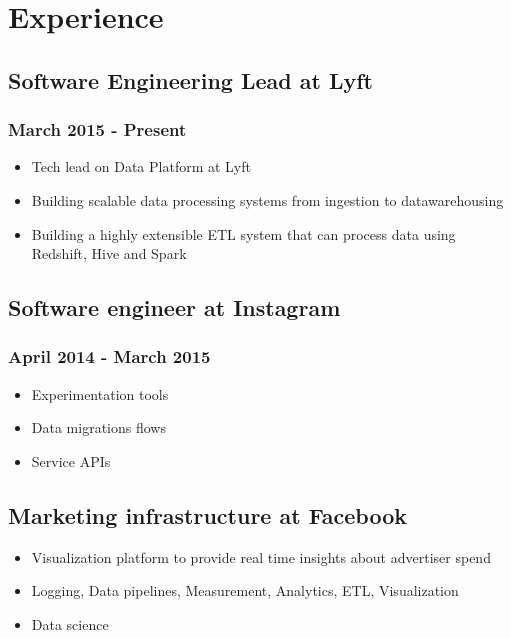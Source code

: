 \documentclass[letterpaper]{article}
\date{\today}
\title{}
\begin{document}

\section{Experience}
\label{sec:Experience}
\subsection{Software Engineering Lead at Lyft}
\label{sec:Software-Engineering-Lead-at-Lyft}
\subsubsection{March 2015 - Present}
\label{sec:March-2015-Present}
\begin{itemize}
\item Tech lead on Data Platform at Lyft
\item Building scalable data processing systems from ingestion to datawarehousing
\item Building a highly extensible ETL system that can process data using Redshift, Hive and Spark
\end{itemize}
\subsection{Software engineer at Instagram}
\label{sec:Software-engineer-at-Instagram}
\subsubsection{April 2014 - March 2015}
\label{sec:April-2014-March-2015}
\begin{itemize}
\item Experimentation tools
\item Data migrations flows
\item Service APIs
\end{itemize}
\subsection{Marketing infrastructure at Facebook}
\label{sec:Marketing-infrastructure-at-Facebook}
\begin{itemize}
\item Visualization platform to provide real time insights about advertiser spend
\item Logging, Data pipelines, Measurement, Analytics, ETL, Visualization
\item Data science
\end{itemize}
\end{document}
